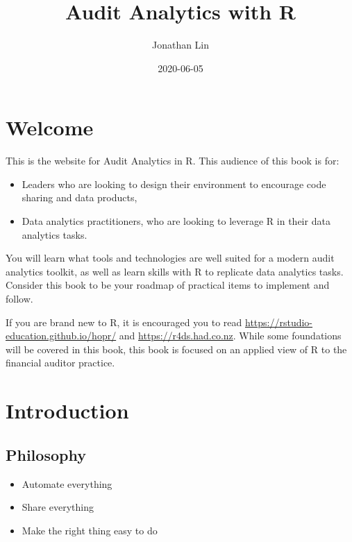 \documentclass[
]{book}
\title{Audit Analytics with R}
\author{Jonathan Lin}
\date{2020-06-05}
\providecommand{\tightlist}{%
  \setlength{\itemsep}{0pt}\setlength{\parskip}{0pt}}
\begin{document}
\maketitle

{
\setcounter{tocdepth}{1}
\tableofcontents
}
\hypertarget{welcome}{%
\chapter*{Welcome}\label{welcome}}

This is the website for Audit Analytics in R. This audience of this book is for:

\begin{itemize}
\tightlist
\item
  Leaders who are looking to design their environment to encourage code sharing and data products,
\item
  Data analytics practitioners, who are looking to leverage R in their data analytics tasks.
\end{itemize}

You will learn what tools and technologies are well suited for a modern audit analytics toolkit, as well as learn skills with R to replicate data analytics tasks. Consider this book to be your roadmap of practical items to implement and follow.

If you are brand new to R, it is encouraged you to read \url{https://rstudio-education.github.io/hopr/} and \url{https://r4ds.had.co.nz}. While some foundations will be covered in this book, this book is focused on an applied view of R to the financial auditor practice.

\hypertarget{intro}{%
\chapter{Introduction}\label{intro}}

\hypertarget{philosophy}{%
\section{Philosophy}\label{philosophy}}

\begin{itemize}
\tightlist
\item
  Automate everything
\item
  Share everything
\item
  Make the right thing easy to do
\end{itemize}
\end{document}
